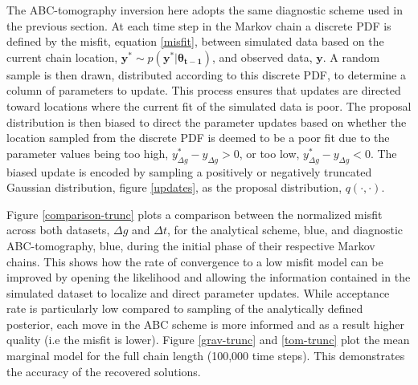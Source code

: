 The ABC-tomography inversion here adopts the same diagnostic scheme used in the previous section. At each time step in the Markov chain a discrete PDF is defined by the misfit, equation \ref{misfit}, between simulated data based on the current chain location, $\bm{y^*} \sim p(\bm{y^*}|\bm{\theta_{t-1}})$,  and observed data, $\bm{y}$. A random sample is then drawn, distributed according to this discrete PDF, to determine a column of parameters to update. This process ensures that updates are directed toward locations where the current fit of the simulated data is poor. The proposal distribution is then biased to direct the parameter updates based on whether the location sampled from the discrete PDF is deemed to be a poor fit due to the parameter values being too high, $y^*_{\Delta g} - y_{\Delta g} > 0$, or too low,  $y^*_{\Delta g} - y_{\Delta g} < 0$. The biased update is encoded by sampling a positively or negatively truncated Gaussian distribution, figure \ref{updates}, as the proposal distribution, $q(\cdot,\cdot)$.\par

Figure \ref{comparison-trunc} plots a comparison between the normalized misfit across both datasets, $\Delta g$ and $\Delta t$, for the analytical scheme, blue, and diagnostic ABC-tomography, blue, during the initial phase of their respective Markov chains. This shows how the rate of convergence to a low misfit model can be improved by opening the likelihood and allowing the information contained in the simulated dataset to localize and direct parameter updates. While acceptance rate is particularly low compared to sampling of the analytically defined posterior, each move in the ABC scheme is more informed and as a result higher quality (i.e the misfit is lower). Figure \ref{grav-trunc} and \ref{tom-trunc} plot the mean marginal model for the full chain length (100,000 time steps). This demonstrates the accuracy of the recovered solutions.\par

